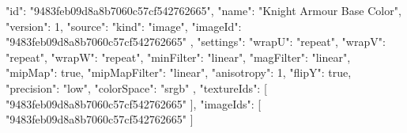 {
  "id": "9483feb09d8a8b7060c57cf542762665",
  "name": "Knight Armour Base Color",
  "version": 1,
  "source": {
    "kind": "image",
    "imageId": "9483feb09d8a8b7060c57cf542762665"
  },
  "settings": {
    "wrapU": "repeat",
    "wrapV": "repeat",
    "wrapW": "repeat",
    "minFilter": "linear",
    "magFilter": "linear",
    "mipMap": true,
    "mipMapFilter": "linear",
    "anisotropy": 1,
    "flipY": true,
    "precision": "low",
    "colorSpace": "srgb"
  },
  "textureIds": [
    "9483feb09d8a8b7060c57cf542762665"
  ],
  "imageIds": [
    "9483feb09d8a8b7060c57cf542762665"
  ]
}
